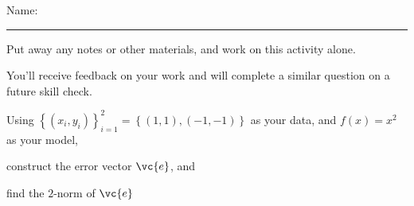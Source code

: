 \documentclass[12pt,letterpaper,noanswers]{exam}
\begin{document}
 \pdfpageheight 11in 
  \pdfpagewidth 8.5in

\noindent Name: \rule{2.5in}{0.5pt}

\noindent Put away any notes or other materials, and work on this activity alone.

\noindent You'll receive feedback on your work and will complete a similar question on a future skill check.


\begin{questions}
\item 
Using $\left\{(x_i,y_i)\right\}_{i=1}^2 = \left\{(1,1), (-1,-1)\right\}$ as your data, and $f(x) = x^2$ as your model, 
\begin{parts}
\item construct the error vector $\vc{e}$, and
\item find the $2$-norm of $\vc{e}$
\end{parts}


\end{questions}
\end{document}
